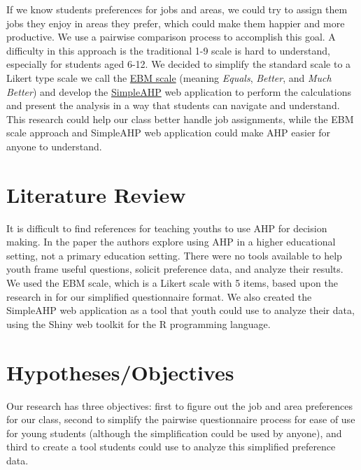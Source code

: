 \documentclass[11pt]{article}
\begin{document}
If we know students preferences for jobs and areas, we could
try to assign them jobs they enjoy in areas they prefer, which could
make them happier and more productive.  We use a pairwise comparison
process to accomplish this goal.  A difficulty in this approach is
the traditional 1-9 scale is hard to understand, especially for students
aged 6-12.  We decided to simplify the standard scale to a Likert type
scale we call the \ul{EBM scale} (meaning \emph{Equals}, 
\emph{Better}, and \emph{Much Better}) and develop the \ul{SimpleAHP}
web application to perform the calculations and present the analysis in a
way that students can navigate and understand.  This research could help our class
better handle job assignments, while the EBM scale approach and SimpleAHP web
application could make AHP easier for anyone to understand.


\section{Literature Review}
It is difficult to find references for teaching youths to use AHP for
decision making.  In the paper \citep{ref1} the authors explore
using AHP in a higher educational setting, not a primary education setting.
There were no tools available to help youth frame useful questions, solicit
preference data, and analyze their results.  
We used the EBM scale, which is a Likert scale with 5 items, based upon
the research in \citep{matell1971there} for our simplified questionnaire format.
We also created the SimpleAHP web application as a tool that youth
could use to analyze their data, using the Shiny web toolkit \citep{shiny}
for the R \citep{R} programming language.

\section{Hypotheses/Objectives}
Our research has three objectives: first to figure out the job and area
preferences for our class, second to simplify the pairwise 
questionnaire process for ease of use for young students (although
the simplification could be used by anyone), and third to create a tool students
could use to analyze this simplified preference data.


\end{document}
